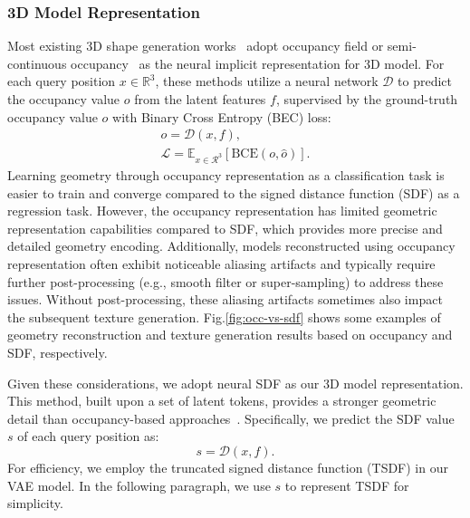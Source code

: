 \subsubsection{3D Model Representation}
Most existing 3D shape generation works~\cite{zhang2024clay,li2024craftsman} adopt occupancy field or semi-continuous occupancy~\cite{wu2024direct3d} as the neural implicit representation for 3D model. For each query position $x \in \mathbb{R}^3$, these methods utilize a neural network $\mathcal{D}$ to predict the occupancy value $o$ from the latent features $f$, supervised by the ground-truth occupancy value $\hat{o}$ with Binary Cross Entropy (BEC) loss: 
\begin{gather}
    o=\mathcal{D}\left(x, f\right), \\
    \mathcal{L} = \mathbb{E}_{x\in \mathcal{R}^3}\left[\text{BCE}\left(o, \hat{o}\right)\right].
\end{gather}
Learning geometry through occupancy representation as a classification task is easier to train and converge compared to the signed distance function (SDF) as a regression task.
However, the occupancy representation has limited geometric representation capabilities compared to SDF, which provides more precise and detailed geometry encoding.
Additionally, models reconstructed using occupancy representation often exhibit noticeable aliasing artifacts and typically require further post-processing (e.g., smooth filter or super-sampling) to address these issues.
Without post-processing, these aliasing artifacts sometimes also impact the subsequent texture generation.
Fig.\ref{fig:occ-vs-sdf} shows some examples of geometry reconstruction and texture generation results based on occupancy and SDF, respectively.


Given these considerations, we adopt neural SDF as our 3D model representation. This method, built upon a set of latent tokens, provides a stronger geometric detail than occupancy-based approaches~\cite{zhang2024clay,li2024craftsman,wu2024direct3d}.
Specifically, we predict the SDF value $s$ of each query position as:
\begin{equation}
    s = \mathcal{D}\left(x, f\right).
\end{equation}
For efficiency, we employ the truncated signed distance function (TSDF) in our VAE model. In the following paragraph, we use $s$ to represent TSDF for simplicity.

